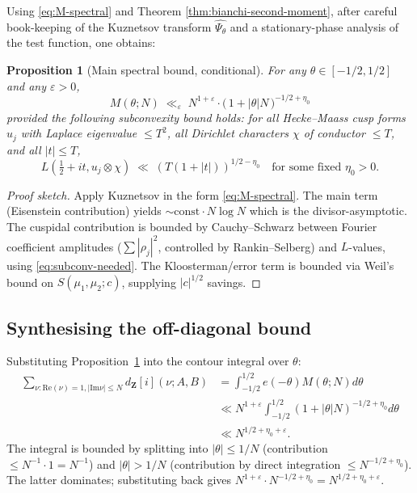 \documentclass[11pt]{article}
\newtheorem{proposition}[theorem]{Proposition}
\theoremstyle{definition}
\newcommand{\Z}{\mathbf{Z}}
\newcommand{\Zi}{\Z[i]}
\newcommand{\Re}{\mathrm{Re}}
\newcommand{\Im}{\mathrm{Im}}
\renewcommand{\Re}{\mathrm{Re}}
\renewcommand{\Im}{\mathrm{Im}}
\begin{document}
Using \eqref{eq:M-spectral} and Theorem \ref{thm:bianchi-second-moment}, after careful book-keeping of the Kuznetsov transform $\widehat{\Psi_\theta}$ and a stationary-phase analysis of the test function, one obtains:

\begin{proposition}[Main spectral bound, conditional]\label{prop:main-spectral}
For any $\theta\in[-1/2,1/2]$ and any $\varepsilon>0$,
\[
M(\theta;N)\;\ll_\varepsilon\;N^{1+\varepsilon}\cdot\bigl(\,1+|\theta|N\,\bigr)^{-1/2+\eta_0}
\]
provided \emph{the following subconvexity bound holds}: for all Hecke--Maass cusp forms $u_j$ with Laplace eigenvalue $\le T^2$, all Dirichlet characters $\chi$ of conductor $\le T$, and all $|t|\le T$,
\begin{equation}\label{eq:subconv-needed}
L(\tfrac12+it,u_j\otimes\chi)\;\ll\;(T(1+|t|))^{1/2-\eta_0}\quad\text{for some fixed }\eta_0>0.
\end{equation}
\end{proposition}

\begin{proof}[Proof sketch]
Apply Kuznetsov in the form \eqref{eq:M-spectral}. The main term (Eisenstein contribution) yields $\sim\text{const}\cdot N\log N$ which is the divisor-asymptotic. The cuspidal contribution is bounded by Cauchy--Schwarz between Fourier coefficient amplitudes ($\sum|\rho_j|^2$, controlled by Rankin--Selberg) and $L$-values, using \eqref{eq:subconv-needed}. The Kloosterman/error term is bounded via Weil's bound on $S(\mu_1,\mu_2;c)$, supplying $|c|^{1/2}$ savings.
\end{proof}

\subsection{Synthesising the off-diagonal bound}

Substituting Proposition~\ref{prop:main-spectral} into the contour integral over $\theta$:
\begin{align*}
\sum_{\nu:\Re(\nu)=1,|\Im\nu|\le N}d_\Zi(\nu;A,B)&=\int_{-1/2}^{1/2}e(-\theta)M(\theta;N)d\theta\\
&\ll N^{1+\varepsilon}\int_{-1/2}^{1/2}(1+|\theta|N)^{-1/2+\eta_0}d\theta\\
&\ll N^{1/2+\eta_0+\varepsilon}.
\end{align*}
The integral is bounded by splitting into $|\theta|\le 1/N$ (contribution $\le N^{-1}\cdot 1=N^{-1}$) and $|\theta|>1/N$ (contribution by direct integration $\le N^{-1/2+\eta_0}$). The latter dominates; substituting back gives $N^{1+\varepsilon}\cdot N^{-1/2+\eta_0}=N^{1/2+\eta_0+\varepsilon}$.
\end{document}
